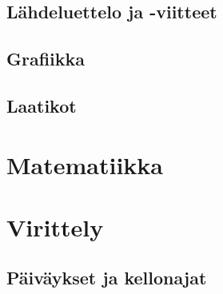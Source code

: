 \documentclass[notitlepage,oneside]{book}
\begin{document}
\section{Lähdeluettelo ja -viitteet}
\section{Grafiikka}
\section{Laatikot}

\chapter{Matematiikka}
\label{luku:matematiikka}

\chapter{Virittely}
\section{Päiväykset ja kellonajat}
\end{document}
